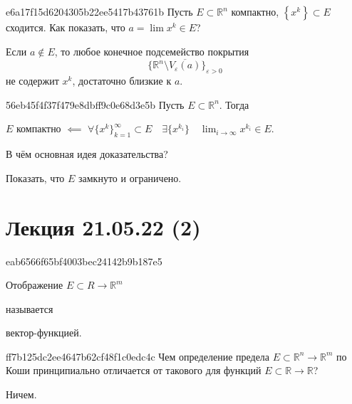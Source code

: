 \begin{note}{e6a17f15d6204305b22ee5417b43761b}
    Пусть \({ E \subset \mathbb R^{n} }\) компактно,\: \({ \left\{ x^k \right\} \subset E }\) сходится.
    Как показать, что \({ a = \lim x^k \in E }\)?

    \begin{cloze}{1}
        Если \({ a \not\in E }\), то любое конечное подсемейство покрытия
        \[
            \Big\{ \mathbb R^{n} \setminus \overline{V_\varepsilon(a)} \Big\}_{\varepsilon > 0}
        \]
        не содержит \({ x^{k} }\), достаточно близкие к \({ a }\).
    \end{cloze}
\end{note}

\begin{note}{56eb45f4f37f479e8dbff9c0e68d3e5b}
    Пусть \({ E \subset \mathbb R^{n} }\).
    Тогда
    \begin{center}
        \({ E }\) компактно \({ \impliedby }\) \({ \displaystyle \forall \{ x^{k} \}_{k = 1}^{\infty} \subset E \quad \exists \{ x^{k_i} \} \quad \lim_{i \to \infty} x^{k_i} \in E }\).
    \end{center}
    В чём основная идея доказательства?

    \begin{cloze}{1}
        Показать, что \({ E }\) замкнуто и ограничено.
    \end{cloze}
\end{note}

\section{Лекция 21.05.22 (2)}
\begin{note}{eab6566f65bf4003bec24142b9b187e5}
    \begin{icloze}{2}Отображение \({ E \subset R \to \mathbb R^{m} }\)\end{icloze} называется \begin{icloze}{1}вектор-фун\-кци\-ей.\end{icloze}
\end{note}

\begin{note}{ff7b125dc2ee4647b62cf48f1c0edc4c}
    Чем определение предела \({ E \subset \mathbb R^{n} \to \mathbb R^{m} }\) по Коши принципиально отличается от такового для функций \({ E \subset \mathbb R \to \mathbb R }\)?

    \begin{cloze}{1}
        Ничем.
    \end{cloze}
\end{note}

